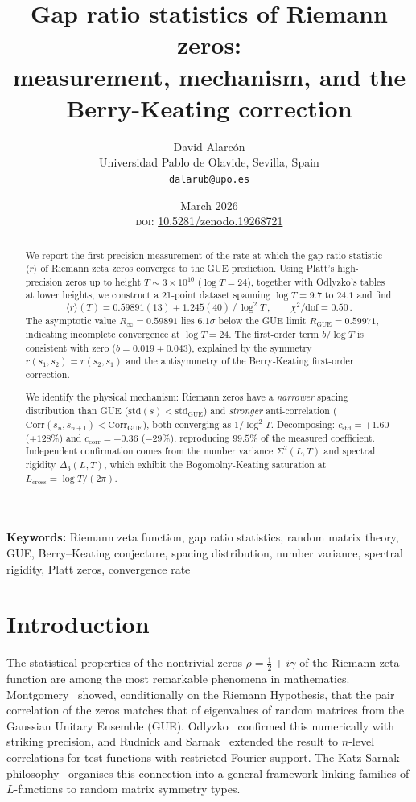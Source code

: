 \documentclass[11pt]{article}
\title{\textbf{Gap ratio statistics of Riemann zeros:\\
measurement, mechanism, and the Berry-Keating correction}}
\author{David Alarc\'on\\
\small Universidad Pablo de Olavide, Sevilla, Spain\\
\small \texttt{dalarub@upo.es}}
\date{March 2026\\[2pt]
\small \textsc{doi}: \href{https://doi.org/10.5281/zenodo.19268721}{10.5281/zenodo.19268721}}
\theoremstyle{plain}
\theoremstyle{remark}
\begin{document}
\maketitle

\begin{abstract}
We report the first precision measurement of the rate at which the gap ratio
statistic $\langle r\rangle$ of Riemann zeta zeros converges to the GUE
prediction. Using Platt's high-precision zeros up to height $T \sim 3\times 10^{10}$
($\log T = 24$), together with Odlyzko's tables at lower heights, we construct
a 21-point dataset spanning $\log T = 9.7$ to $24.1$ and find
\[
  \langle r\rangle(T) = 0.59891(13) + 1.245(40)\,/\,\log^2 T\,,
  \qquad \chi^2/\text{dof} = 0.50\,.
\]
The asymptotic value $R_\infty = 0.59891$ lies $6.1\sigma$ below the GUE
limit $R_{\mathrm{GUE}} = 0.59971$, indicating incomplete convergence at
$\log T = 24$. The first-order term $b/\log T$ is consistent with zero
($b = 0.019 \pm 0.043$), explained by the symmetry $r(s_1,s_2)=r(s_2,s_1)$
and the antisymmetry of the Berry-Keating first-order correction.

We identify the physical mechanism: Riemann zeros have a \emph{narrower}
spacing distribution than GUE ($\mathrm{std}(s) < \mathrm{std}_{\mathrm{GUE}}$)
and \emph{stronger} anti-correlation ($\mathrm{Corr}(s_n,s_{n+1}) <
\mathrm{Corr}_{\mathrm{GUE}}$), both converging as $1/\log^2 T$. Decomposing:
$c_{\mathrm{std}} = +1.60$ ($+128\%$) and $c_{\mathrm{corr}} = -0.36$ ($-29\%$),
reproducing $99.5\%$ of the measured coefficient. Independent confirmation
comes from the number variance $\Sigma^2(L,T)$ and spectral rigidity
$\Delta_3(L,T)$, which exhibit the Bogomolny-Keating saturation at
$L_{\mathrm{cross}} = \log T/(2\pi)$.
\end{abstract}

\bigskip
\noindent\textbf{Keywords:} Riemann zeta function, gap ratio statistics, random matrix theory, GUE, Berry--Keating conjecture, spacing distribution, number variance, spectral rigidity, Platt zeros, convergence rate

\bigskip


\section{Introduction}
\label{sec:intro}

The statistical properties of the nontrivial zeros
$\rho = \tfrac{1}{2} + i\gamma$ of the Riemann zeta function are among
the most remarkable phenomena in mathematics. Montgomery~\cite{montgomery1973}
showed, conditionally on the Riemann Hypothesis, that the pair correlation
of the zeros matches that of eigenvalues of random matrices from the
Gaussian Unitary Ensemble (GUE). Odlyzko~\cite{odlyzko1987} confirmed
this numerically with striking precision, and Rudnick and
Sarnak~\cite{rudnick1996} extended the result to $n$-level correlations
for test functions with restricted Fourier support. The Katz-Sarnak
philosophy~\cite{katzsarnak1999} organises this connection into a general
framework linking families of $L$-functions to random matrix symmetry types.
\end{document}
